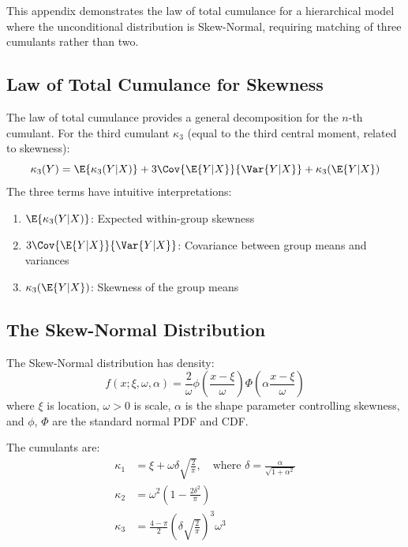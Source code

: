 \label{app:skew_normal}

This appendix demonstrates the law of total cumulance for a hierarchical model
where the unconditional distribution is Skew-Normal, requiring matching of
three cumulants rather than two.

\subsection{Law of Total Cumulance for Skewness}

The law of total cumulance provides a general decomposition for the $n$-th
cumulant. For the third cumulant $\kappa_3$ (equal to the third central moment,
related to skewness):
\begin{equation}
  \label{eq:total_skewness}
  \kappa_3(Y) = \E{\kappa_3(Y|X)} + 3\Cov{\E{Y|X}}{\Var{Y|X}} + \kappa_3(\E{Y|X})
\end{equation}
\noindent The three terms have intuitive interpretations:
\begin{enumerate}
  \item $\E{\kappa_3(Y|X)}$: Expected within-group skewness
  \item $3\Cov{\E{Y|X}}{\Var{Y|X}}$: Covariance between group means and variances
  \item $\kappa_3(\E{Y|X})$: Skewness of the group means
\end{enumerate}

\subsection{The Skew-Normal Distribution}

The Skew-Normal distribution has density:
\begin{equation}
  f(x; \xi, \omega, \alpha) = \frac{2}{\omega} \phi\left(\frac{x-\xi}{\omega}\right) \Phi\left(\alpha\frac{x-\xi}{\omega}\right)
\end{equation}
where $\xi$ is location, $\omega > 0$ is scale, $\alpha$ is the shape parameter
controlling skewness, and $\phi$, $\Phi$ are the standard normal PDF and CDF.

The cumulants are:
\begin{align}
  \kappa_1 &= \xi + \omega \delta \sqrt{\frac{2}{\pi}}, \quad \text{where } \delta = \frac{\alpha}{\sqrt{1+\alpha^2}} \\
  \kappa_2 &= \omega^2 \left(1 - \frac{2\delta^2}{\pi}\right) \\
  \kappa_3 &= \frac{4-\pi}{2} \left(\delta\sqrt{\frac{2}{\pi}}\right)^3 \omega^3
\end{align}

